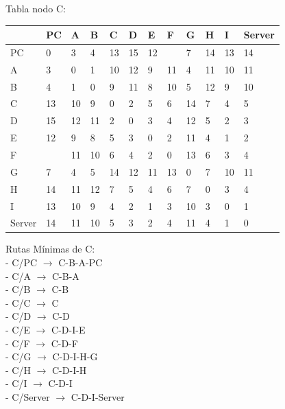 \documentclass[a4paper]{article}
\begin{document}
\clearpage




\begin{table}[ht]
Tabla nodo C:\\
\begin{tabular}{|l|l|l|l|l|l|l|l|l|l|l|l|}
\hline
       & PC & A  & B & C & D & E & F & G & H & I  & Server \\ \hline
PC     & 0  & 3  & 4 & 13& 15& 12&   & 7 & 14& 13 & 14     \\ \hline
A      & 3  & 0  & 1 & 10& 12& 9 & 11& 4 & 11& 10 & 11     \\ \hline
B      & 4  & 1  & 0 & 9 & 11& 8 & 10& 5 & 12& 9  & 10     \\ \hline
C      & 13 & 10 & 9 & 0 & 2 & 5 & 6 & 14& 7 & 4  & 5      \\ \hline
D      & 15 & 12 & 11& 2 & 0 & 3 & 4 & 12& 5 & 2  & 3      \\ \hline
E      & 12 & 9  & 8 & 5 & 3 & 0 & 2 & 11& 4 & 1  & 2      \\ \hline
F      &    & 11 & 10& 6 & 4 & 2 & 0 & 13& 6 & 3  & 4      \\ \hline
G      & 7  & 4  & 5 & 14& 12& 11& 13& 0 & 7 & 10 & 11     \\ \hline
H      & 14 & 11 & 12& 7 & 5 & 4 & 6 & 7 & 0 & 3  & 4      \\ \hline
I      & 13 & 10 & 9 & 4 & 2 & 1 & 3 & 10& 3 & 0  & 1      \\ \hline
Server & 14 & 11 & 10& 5 & 3 & 2 & 4 & 11& 4 & 1  & 0      \\ \hline
\end{tabular}

Rutas Mínimas de C:\\
-	C/PC  $\rightarrow$  C-B-A-PC\\
-	C/A  $\rightarrow$  C-B-A\\
-	C/B  $\rightarrow$  C-B\\
-	C/C  $\rightarrow$  C\\
-	C/D  $\rightarrow$  C-D\\
-	C/E  $\rightarrow$  C-D-I-E\\
-	C/F  $\rightarrow$  C-D-F\\
-	C/G  $\rightarrow$  C-D-I-H-G\\
-	C/H  $\rightarrow$  C-D-I-H\\
-	C/I  $\rightarrow$  C-D-I\\
-	C/Server  $\rightarrow$  C-D-I-Server\\
\end{table}
\end{document}
